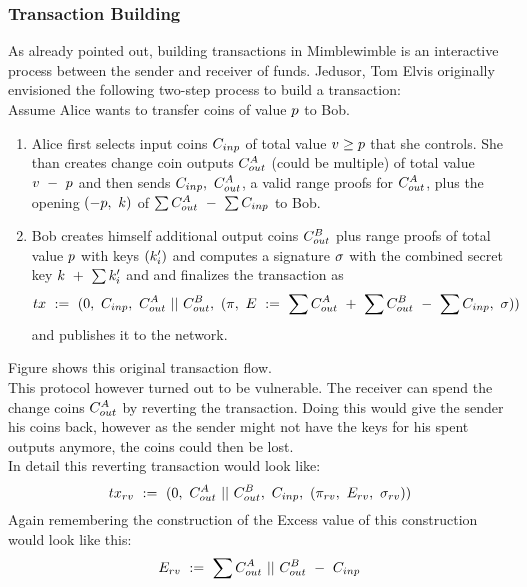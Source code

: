 \subsubsection{Transaction Building}
As already pointed out, building transactions in Mimblewimble is an interactive process between the sender and receiver of funds. Jedusor, Tom Elvis originally envisioned the following two-step process
to build a transaction:~\cite{jedusor2016mimblewimble}\\
Assume Alice wants to transfer coins of value $p$ to Bob.
\begin{enumerate}
    \item Alice first selects input coins $C_{inp}$ of total value $v \geq p$ that she controls. She than creates change coin outputs $C_{out}^{A}$ (could be multiple) of total value $v ~-~ p$ and then
    sends $C_{inp} ,~ C_{out}^{A}$, a valid range proofs for $C_{out}^{A}$, plus the opening $(-p ,~ k)$ of $\sum{C_{out}^{A}} ~-~ \sum{C_{inp}}$ to Bob.
    \item Bob creates himself additional output coins $C_{out}^B$ plus range proofs of total value $p$ with keys $(k'_i)$ and computes a signature $\sigma$ with the combined secret key $k ~+~ \sum{k'_i}$ and
    and finalizes the transaction as
    \[ tx ~:=~ (0 ,~ C_{inp} ,~ C_{out}^A ~||~ C_{out}^B ,~ (\pi ,~ E ~:=~ \sum{C_{out}^A} ~+~ \sum{C_{out}^B} ~-~ \sum{C_{inp}} ,~ \sigma)) \]
    and publishes it to the network.
\end{enumerate}
Figure shows this original transaction flow.\\
This protocol however turned out to be vulnerable. The receiver can spend the change coins $C_{out}^A$ by reverting the transaction. Doing this would give the sender his coins back, however as the sender
might not have the keys for his spent outputs anymore, the coins could then be lost.\\
In detail this reverting transaction would look like:
\[ tx_{rv} ~:=~ (0 ,~ C_{out}^A ~||~ C_{out}^B ,~ C_{inp} ,~ (\pi_{rv} ,~ E_{rv} ,~ \sigma_{rv}) ) \]
Again remembering the construction of the Excess value of this construction would look like this:
\[ E_{rv} ~:=~ \sum{C_{out}^A ~||~C_{out}^B ~-~C_{inp}} \]
